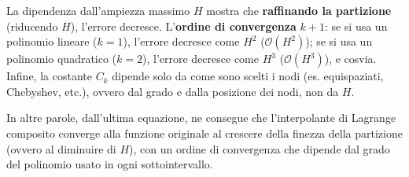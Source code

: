 \begin{itemize}
\begin{takeawaysbox}
\begin{itemize}
\begin{enumerate}
\begin{itemize}
\begin{equation*}
                    \end{equation*}
                \end{itemize}
                La dipendenza dall'ampiezza massimo $H$ mostra che \textbf{raffinando la partizione} (riducendo $H$), l'errore decresce. L'\textbf{ordine di convergenza} \eaccent $k+1$: se si usa un polinomio lineare ($k=1$), l'errore decresce come $H^{2}$ ($\mathcal{O}(H^{2})$); se si usa un polinomio quadratico ($k=2$), l'errore decresce come $H^{3}$ ($\mathcal{O}(H^{3})$), e cos\iaccent via. Infine, la costante $C_{k}$ dipende solo da come sono scelti i nodi (es. equispaziati, Chebyshev, etc.), ovvero dal grado e dalla posizione dei nodi, non da $H$.
                
                In altre parole, dall'ultima equazione, ne consegue che l'interpolante di Lagrange composito converge alla funzione originale al crescere della finezza della partizione (ovvero al diminuire di $H$), con un ordine di convergenza che dipende dal grado del polinomio usato in ogni sottointervallo.
            \end{enumerate}
        \end{itemize}
    \end{takeawaysbox}
\end{itemize}